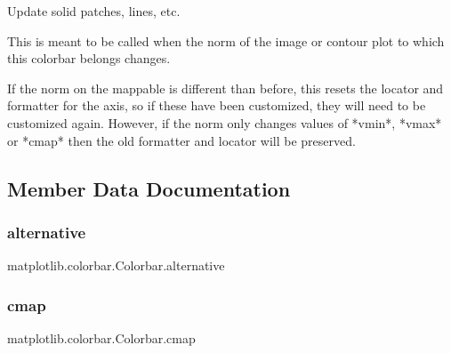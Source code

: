 \begin{DoxyVerb}Update solid patches, lines, etc.

This is meant to be called when the norm of the image or contour plot
to which this colorbar belongs changes.

If the norm on the mappable is different than before, this resets the
locator and formatter for the axis, so if these have been customized,
they will need to be customized again.  However, if the norm only
changes values of *vmin*, *vmax* or *cmap* then the old formatter
and locator will be preserved.
\end{DoxyVerb}
 

\subsection{Member Data Documentation}
\mbox{\label{classmatplotlib_1_1colorbar_1_1Colorbar_a5acd00b6c4b82a162744a2a4e028d929}} 
\subsubsection{\texorpdfstring{alternative}{alternative}}
{\footnotesize\ttfamily matplotlib.\+colorbar.\+Colorbar.\+alternative\hspace{0.3cm}{\ttfamily [static]}}

\mbox{\label{classmatplotlib_1_1colorbar_1_1Colorbar_a5bdcb0c2825bef8f0481fa134196607c}} 
\subsubsection{\texorpdfstring{cmap}{cmap}}
{\footnotesize\ttfamily matplotlib.\+colorbar.\+Colorbar.\+cmap}

\mbox{\label{classmatplotlib_1_1colorbar_1_1Colorbar_aaf2904de762ad18d32196a89e9c1a769}} 

